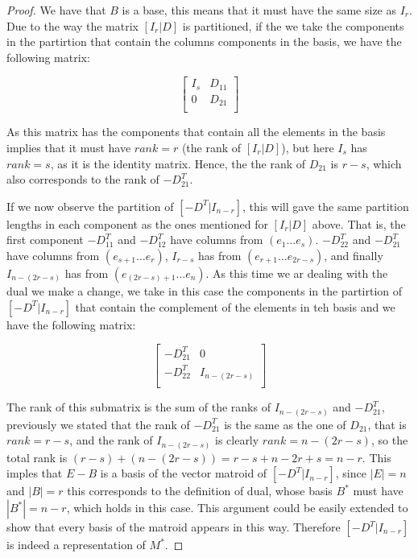 \begin{proof}
    We have that $B$ is a base, this means that it must have the same size as $I_r$. Due to the way the matrix $[I_r|D]$ is partitioned, if the we take the components in the partirtion that contain the columns components in the basis, we have the following matrix:
    \begin{figure}[H]
        \centering
        $$\begin{bmatrix}
        I_s & D_{11}\\
        0 & D_{21}\\
        \end{bmatrix}$$
    \end{figure}
    As this matrix has the components that contain all the elements in the basis implies that it must have $rank = r$ (the rank of $[I_r|D]$), but here $I_s$ has $rank = s$, as it is the identity matrix. Hence, the the rank of $D_{21}$ is $r-s$, which also corresponds to the rank of $-D_21^T$.
    
    If we now observe the partition of $[-D^T|I_{n-r}]$, this will gave the same partition lengths in each component as the ones mentioned for $[I_r|D]$ above. That is, the first component $-D_{11}^T$ and $-D_{12}^T$ have columns from $(e_1 \dots e_s)$. $-D_{22}^T$ and $-D_{21}^T$ have columns from $(e_{s+1} \dots e_r)$, $I_{r-s}$ has from $(e_{r+1} \dots e_{2r-s})$, and finally $ I_{n-(2r-s)}$ has from $(e_{(2r-s)+1} \dots e_n)$.
    As this time we ar dealing with the dual we make a change, we take in this case the components in the partirtion of $[-D^T|I_{n-r}]$ that contain the complement of the elements in teh basis and we have the following matrix:
    \begin{figure}[H]
        \centering
        $$\begin{bmatrix}
        -D_{21}^T & 0\\
        -D_{22}^T & I_{n-(2r-s)}\\
        \end{bmatrix}$$
    \end{figure}
   The rank of this submatrix is the sum of the ranks of $I_{n-(2r-s)}$ and $-D_{21}^T$, previously we stated that the rank of $-D_{21}^T$ is the same as the one of $D_{21}$, that is $rank = r-s$, and the rank of $I_{n-(2r-s)}$ is clearly $rank= n-(2r-s)$, so the total rank is $(r-s)+(n-(2r-s))= r-s+n-2r+s = n-r$. This imples that $E-B$ is a basis of the vector matroid of $[-D^T|I_{n-r}]$, since $|E|= n$ and $|B|= r$ this corresponds to the definition of dual, whose basis $B^*$ must have $|B^*|= n-r$, which holds in this case. This argument could be easily extended to show that every basis of the matroid appears in this way. Therefore $[-D^T|I_{n-r}]$ is indeed a representation of $M^*$.
\end{proof}

